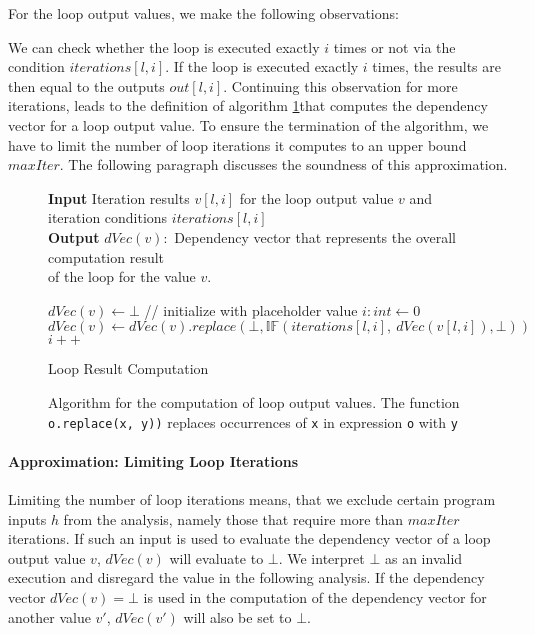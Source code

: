For the loop output values, we make the following observations:

We can check whether the loop is executed exactly $i$ times or not via the condition $iterations[l, i]$. If the loop is executed exactly $i$ times, the results are then equal to the outputs $out[l, i]$.  Continuing this observation for more iterations, leads to the definition of algorithm \ref{alg:loop}that computes the dependency vector for a loop output value. To ensure the termination of the algorithm, we have to limit the number of loop iterations it computes to an upper bound $maxIter$. The following paragraph discusses the soundness of this approximation.
\begin{figure}
    \centering
    \begin{algorithm}[H]
    \hspace*{\algorithmicindent} \textbf{Input} Iteration results $v[l, i]$ for the loop output value $v$ and \\
    \hspace*{\algorithmicindent} iteration conditions $iterations[l, i]$ \\
    \hspace*{\algorithmicindent} \textbf{Output} $dVec(v):$ Dependency vector that represents the overall computation result\\
    \hspace*{\algorithmicindent} \hspace*{\algorithmicindent}of the loop for the value $v$. \\
    
    \begin{algorithmic}[1]
        \State $dVec(v) \leftarrow \bot$ // initialize with placeholder value
        \State $i: int \leftarrow 0$
            \State $dVec(v) \leftarrow dVec(v).replace(\bot, \mathbb{IF}(iterations[l, i], \: dVec(v[l, i]), \bot))$
            \State $i++$
        \EndWhile
        \end{algorithmic}
\caption{Loop Result Computation}\label{alg:loop}
\end{algorithm}
    \caption{Algorithm for the computation of loop output values. The function \texttt{o.replace(x, y))} replaces occurrences of \texttt{x} in expression \texttt{o} with \texttt{y}}
\end{figure}


\paragraph{Approximation: Limiting Loop Iterations}\label{sec:approx}
Limiting the number of loop iterations means, that we exclude certain program inputs $h$ from the analysis, namely those that require more than $maxIter$ iterations. If such an input is used to evaluate the dependency vector of a loop output value $v$, $dVec(v)$ will evaluate to $\bot$. We interpret $\bot$ as an invalid execution and disregard the value in the following analysis. If the dependency vector $dVec(v) = \bot$ is used in the computation of the dependency vector for another value $v'$, $dVec(v')$ will also be set to $\bot$.

